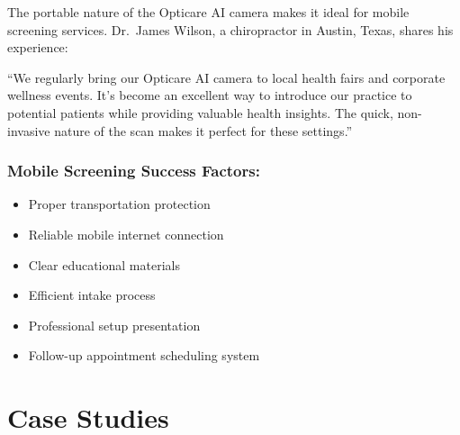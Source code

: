 \documentclass[
  Letterpaper,
]{scrbook}
\providecommand{\tightlist}{%
  \setlength{\itemsep}{0pt}\setlength{\parskip}{0pt}}\usepackage{longtable,booktabs,array}
\begin{document}
The portable nature of the Opticare AI camera makes it ideal for mobile
screening services. Dr.~James Wilson, a chiropractor in Austin, Texas,
shares his experience:

``We regularly bring our Opticare AI camera to local health fairs and
corporate wellness events. It's become an excellent way to introduce our
practice to potential patients while providing valuable health insights.
The quick, non-invasive nature of the scan makes it perfect for these
settings.''

\subsubsection{Mobile Screening Success
Factors:}\label{mobile-screening-success-factors}

\begin{itemize}
\tightlist
\item
  Proper transportation protection
\item
  Reliable mobile internet connection
\item
  Clear educational materials
\item
  Efficient intake process
\item
  Professional setup presentation
\item
  Follow-up appointment scheduling system
\end{itemize}

\section{Case Studies}\label{case-studies}
\end{document}
